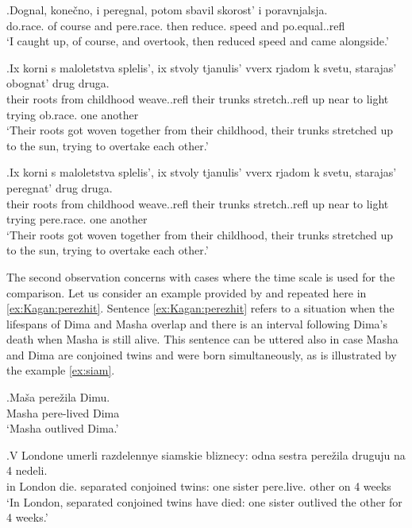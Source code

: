 \exg.\label{ex:comparison:peregnat}Dognal, kone\v{c}no, i peregnal, potom sbavil skorost' i poravnjalsja.\\
do.race. {of course} and pere.race. then reduce. speed and po.equal..refl\\
\trans `I caught up, of course, and overtook, then reduced speed and came alongside.'

\exg.\label{ex:comparison:obognat}Ix korni s maloletstva splelis', ix stvoly tjanulis' vverx rjadom k svetu, starajas' obognat' drug druga.\\
their roots from childhood weave..refl their trunks stretch..refl up near to light trying ob.race. one another\\
\trans `Their roots got woven together from their childhood, their trunks stretched up to the sun, trying to overtake each other.'\\

\exg.\label{ex:peregnat}Ix korni s maloletstva splelis', ix stvoly tjanulis' vverx rjadom k svetu, starajas' peregnat' drug druga.\\
their roots from childhood weave..refl their trunks stretch..refl up near to light trying pere.race. one another\\
\trans `Their roots got woven together from their childhood, their trunks stretched up to the sun, trying to overtake each other.'

The second observation concerns with cases where the time scale is used for the comparison. Let us consider an example provided by \citet[142]{Kagan:book} and repeated here in \ref{ex:Kagan:perezhit}. Sentence \ref{ex:Kagan:perezhit} refers to a situation when the lifespans of Dima and Masha overlap and there is an interval following Dima's death when Masha is still alive. This sentence can be uttered also in case Masha and Dima are conjoined twins and were born simultaneously, as is illustrated by the example \ref{ex:siam}.

\exg.\label{ex:Kagan:perezhit}Ma\v{s}a pere\v{z}ila Dimu.\\
Masha pere-lived Dima\\
\trans `Masha outlived Dima.'

\exg.\label{ex:siam}V Londone umerli razdelennye siamskie bliznecy: odna sestra pere\v{z}ila druguju na 4 nedeli.\\
in London die. separated conjoined twins: one sister pere.live. other on 4 weeks\\
\trans `In London, separated conjoined twins have died: one sister outlived the other for 4 weeks.'

